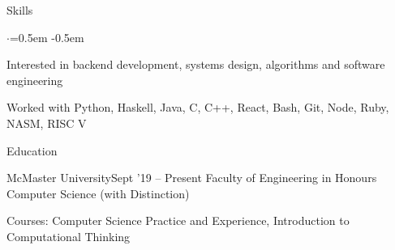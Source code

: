 \documentclass{resume} %
\begin{document}

\begin{rSection}{Skills}
  \vspace {0.2em}
  \begin{list}{$\cdot$}{\leftmargin=0.5em}
    \itemsep -0.5em \vspace{-0.3em}
    \item Interested in backend development, systems design, algorithms and
      software engineering
    \item Worked with Python, Haskell, Java, C, C++, React, Bash,
      Git, Node, Ruby, NASM, RISC V
  \end{list}
  \vspace{0.1em}
\end{rSection}


\begin{rSection}{Education}
  \begin{rSubsection}{McMaster University}{Sept '19 -- Present}
                     {Faculty of Engineering in Honours Computer Science (with Distinction)}{}
      \item Courses: Computer Science Practice and Experience, Introduction to Computational Thinking
  \end{rSubsection}
\end{rSection}

\end{document}
